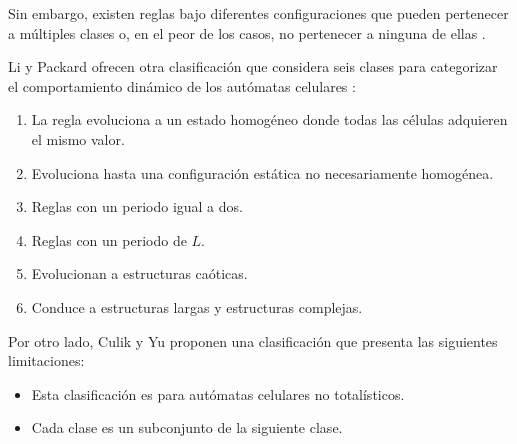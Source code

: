 Sin embargo, existen reglas bajo diferentes configuraciones que pueden pertenecer a múltiples clases o, en el peor de los casos, no pertenecer a ninguna de ellas \cite{genaro2000_campo_promedio}. 

Li y Packard ofrecen otra clasificación que considera seis clases para categorizar el comportamiento dinámico de los autómatas celulares \cite{Martinez2013note}:
\begin{enumerate}[label*=LP \Roman*, leftmargin=*]
	\item La regla evoluciona a un estado homogéneo donde todas las células adquieren el mismo valor.
	\item Evoluciona hasta una configuración estática no necesariamente homogénea.
	\item Reglas con un periodo igual a dos.
	\item Reglas con un periodo de $L$.
	\item Evolucionan a estructuras caóticas.
	\item Conduce a estructuras largas y estructuras complejas.
\end{enumerate}

Por otro lado, Culik y Yu \cite{Martinez2013note, culik1988_class} proponen una clasificación que presenta las siguientes limitaciones: 

\begin{itemize}
	\item Esta clasificación es para autómatas celulares no totalísticos. 
	\item Cada clase es un subconjunto de la siguiente clase.
\end{itemize}

